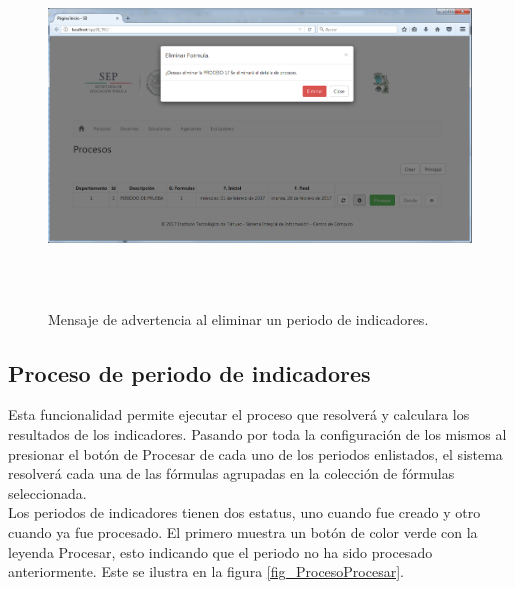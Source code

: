 		    \begin{figure}[]
		        \centering
		        \includegraphics[width=16cm, height=9.5cm]{figuras/ProcesoElimina}
		        \caption{Mensaje de advertencia al eliminar un periodo de indicadores.}
		        \label{fig_ProcesoElimina}
		    \end{figure}

		    \subsection{Proceso de periodo de indicadores}

		    Esta funcionalidad permite ejecutar el proceso que resolver\'a y calculara los resultados de los indicadores. Pasando por toda la configuraci\'on de los mismos al presionar el bot\'on de Procesar de cada uno de los periodos enlistados, el sistema resolver\'a cada una de las f\'ormulas agrupadas en la colecci\'on de f\'ormulas seleccionada.\\

			Los periodos de indicadores tienen dos estatus, uno cuando fue creado y otro cuando ya fue procesado. El primero muestra un bot\'on de color verde con la leyenda Procesar, esto indicando que el periodo no ha sido procesado anteriormente. Este se ilustra en la figura \ref{fig_ProcesoProcesar}.\\


